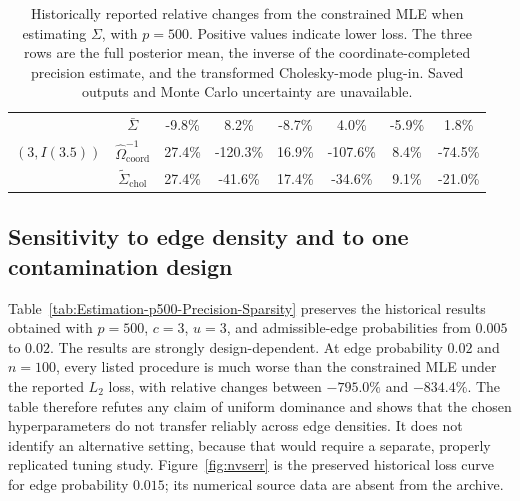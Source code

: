 \documentclass[12pt]{article}
\theoremstyle{plain}
\theoremstyle{definition}
\theoremstyle{remark}
\begin{document}
\begin{table}[H]
\begin{center}
\begin{tabular}{ |c|c|cc|cc|cc| }
 \hline
  \multirow{3}{*}{$(3,I(3.5))$} &$\bar\Sigma$          & -9.8\% & 8.2\% & -8.7\% & 4.0\%  & -5.9\% & 1.8\% \\
                                              & $\widehat\Omega_{\mathrm{coord}}^{-1}$  & 27.4\% & -120.3\%  & 16.9\% & -107.6\%  & 8.4\% & -74.5\%\\
                                              & $\widetilde\Sigma_{\mathrm{chol}}$             & 27.4\% & -41.6\%  & 17.4\% & -34.6\%  & 9.1\%   & -21.0\%\\
 \hline
 \end{tabular}
\end{center}
\caption{Historically reported relative changes from the constrained MLE
when estimating $\Sigma$, with $p=500$.  Positive values indicate lower
loss.  The three rows are the full posterior mean, the inverse of the
coordinate-completed precision estimate, and the transformed
Cholesky-mode plug-in.  Saved outputs and Monte Carlo uncertainty are
unavailable.}
\label{tab:Estimation-p500-Covariance-detail}
\end{table}

\subsection*{Sensitivity to edge density and to one contamination design}
\label{sec:suppOutlier}
Table~\ref{tab:Estimation-p500-Precision-Sparsity} preserves the historical
results obtained with $p=500$, $c=3$, $u=3$, and admissible-edge
probabilities from $0.005$ to $0.02$.  The results are strongly
design-dependent.  At edge probability $0.02$ and $n=100$, every listed
procedure is much worse than the constrained MLE under the reported $L_2$
loss, with relative changes between $-795.0\%$ and $-834.4\%$.  The table
therefore refutes any claim of uniform dominance and shows that the chosen
hyperparameters do not transfer reliably across edge densities.  It does
not identify an alternative setting, because that would require a separate,
properly replicated tuning study.  Figure~\ref{fig:nvserr} is the preserved
historical loss curve for edge probability $0.015$; its numerical source
data are absent from the archive.
 
\end{document}
